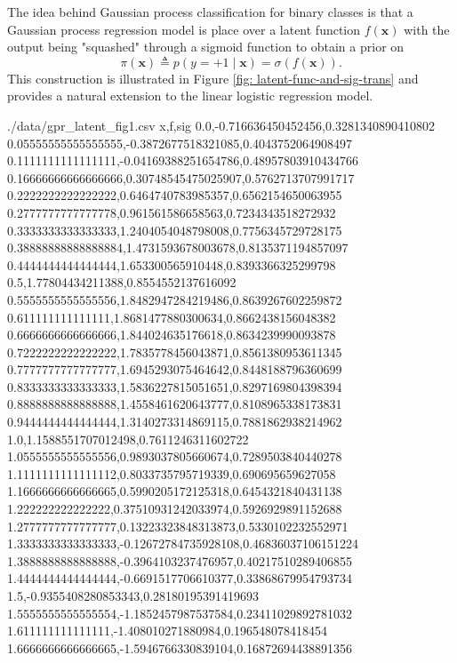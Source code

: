 The idea behind Gaussian process classification for binary classes is that a Gaussian process regression model is place over a latent function $f \left( \bm{x} \right)$ with the output being "squashed" through a sigmoid function to obtain a prior on
\begin{equation*}
    \pi \left( \bm{x} \right) \triangleq p \left( y=+1 \mid \bm{x} \right) = \sigma \left( f \left( \bm{x} \right) \right).
\end{equation*}
This construction is illustrated in Figure \ref{fig: latent-func-and-sig-trans} and provides a natural extension to the linear logistic regression model.

\begin{filecontents*}{./data/gpr_latent_fig1.csv}
    x,f,sig
    0.0,-0.716636450452456,0.3281340890410802
    0.05555555555555555,-0.3872677518321085,0.4043752064908497
    0.1111111111111111,-0.04169388251654786,0.48957803910434766
    0.16666666666666666,0.30748545475025907,0.5762713707991717
    0.2222222222222222,0.6464740783985357,0.6562154650063955
    0.2777777777777778,0.961561586658563,0.7234343518272932
    0.3333333333333333,1.2404054048798008,0.7756345729728175
    0.38888888888888884,1.4731593678003678,0.8135371194857097
    0.4444444444444444,1.653300565910448,0.8393366325299798
    0.5,1.77804434211388,0.8554552137616092
    0.5555555555555556,1.8482947284219486,0.8639267602259872
    0.611111111111111,1.8681477880300634,0.8662438156048382
    0.6666666666666666,1.844024635176618,0.8634239990093878
    0.7222222222222222,1.7835778456043871,0.8561380953611345
    0.7777777777777777,1.6945293075464642,0.8448188796360699
    0.8333333333333333,1.5836227815051651,0.8297169804398394
    0.8888888888888888,1.4558461620643777,0.8108965338173831
    0.9444444444444444,1.3140273314869115,0.7881862938214962
    1.0,1.1588551707012498,0.7611246311602722
    1.0555555555555556,0.9893037805660674,0.7289503840440278
    1.1111111111111112,0.8033735795719339,0.690695659627058
    1.1666666666666665,0.5990205172125318,0.6454321840431138
    1.222222222222222,0.37510931242033974,0.5926929891152688
    1.2777777777777777,0.13223323848313873,0.5330102232552971
    1.3333333333333333,-0.12672784735928108,0.46836037106151224
    1.3888888888888888,-0.3964103237476957,0.40217510289406855
    1.4444444444444444,-0.6691517706610377,0.33868679954793734
    1.5,-0.9355408280853343,0.28180195391419693
    1.5555555555555554,-1.1852457987537584,0.23411029892781032
    1.611111111111111,-1.408010271880984,0.196548078418454
    1.6666666666666665,-1.5946766330839104,0.16872694438891356

\end{filecontents*}
